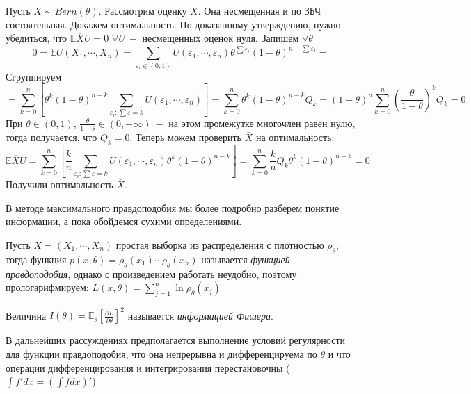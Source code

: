 \begin{example}
Пусть $X \sim Bern\left(\theta\right)$. Рассмотрим оценку $\overline{X}$. Она несмещенная и по ЗБЧ состоятельная.  Докажем оптимальность. По доказанному утверждению, нужно убедиться, что $\mathbb{E} \overline{X} U = 0$ $\forall U \ -$ несмещенных оценок нуля. Запишем $\forall \theta$
\[
    0 =\mathbb{E} U\left(X_1, \cdots, X_n\right) = \sum_{\varepsilon_i \in \left\{0, 1\right\} } U\left(\varepsilon_1, \cdots, \varepsilon_n\right) \theta ^ {\sum \varepsilon_i} \left(1 - \theta\right) ^ {n - \sum \varepsilon_i} = 
\]
Сгруппируем
\[
    = \sum_{k = 0}^{n}  \left[\theta ^ {k} \left(1 - \theta\right) ^ {n - k} \sum_{\varepsilon_i: \sum \varepsilon = k} U\left(\varepsilon_1, \cdots, \varepsilon_n\right)\right] = \sum_{k = 0}^{n}  \theta ^ {k} \left(1 - \theta\right) ^ {n - k} Q_k = \left(1 - \theta\right) ^ n \sum_{k = 0}^{n}  \left(\frac{\theta}{1 - \theta}\right) ^ k Q_k = 0
\]
При $\theta \in \left(0, 1\right)$, $\frac{\theta}{1 - \theta} \in \left(0, +\infty\right) \ - $ на этом промежутке многочлен равен нулю, тогда получается, что $Q_k = 0$. Теперь можем проверить $\overline{X}$ на оптимальность:
\[
    \mathbb{E} \overline{X} U = \sum_{k = 0}^{n} \left[\frac{k}{n} \sum_{\varepsilon_i: \sum \varepsilon = k} U\left(\varepsilon_1, \cdots, \varepsilon_n\right) \theta ^ {k} \left(1 - \theta\right) ^ {n - k}\right] = \sum_{k = 0}^{n} \frac k n Q_k \theta ^ {k} \left(1 - \theta\right) ^ {n - k} = 0
\]
Получили оптимальность $\overline{X}$. 
\end{example}
В методе максимального правдоподобия мы более подробно разберем понятие информации, а пока обойдемся сухими определениями.
\begin{definition}
Пусть $X = \left(X_1, \cdots, X_n\right)$ простая выборка из распределения с плотностью $\rho_\theta$, тогда функция $p\left(x, \theta\right) = \rho_{\theta}\left(x_1\right) \cdots \rho_\theta\left(x_n\right)$ называется \textit{функцией правдоподобия}, однако с произведением работать неудобно, поэтому прологарифмируем: $L\left(x, \theta\right) = \sum_{j = 1}^n \ln \rho_\theta\left(x_j\right)$
\end{definition}
\begin{definition}
Величина $I\left(\theta\right) = \mathbb{E}_\theta \left[\frac{\partial L}{\partial \theta}\right] ^ 2$ называется \textit{информацией Фишера}.
\end{definition}
В дальнейших рассуждениях предполагается выполнение условий регулярности для функции правдоподобия, что она непрерывна и дифференцируема по $\theta$ и что операции дифференцирования и интегрирования перестановочны ($\int f' dx = \left(\int f dx\right)'$)
